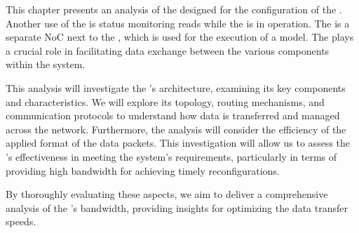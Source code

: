 This chapter presents an analysis of the \confignoc{} designed for the configuration of the \graicore{}.
Another use of the \confignoc{} is status monitoring reads while the \graicore{} is in operation.
The \confignoc{} is a separate NoC next to the \eventnoc{}, which is used for the execution of a model.
The \confignoc{} plays a crucial role in facilitating data exchange between the various components within the system.

This analysis will investigate the \confignoc{}'s architecture, examining its key components and characteristics.
We will explore its topology, routing mechanisms, and communication protocols to understand how data is transferred and managed across the network.
Furthermore, the analysis will consider the efficiency of the applied format of the data packets.  
This investigation will allow us to assess the \confignoc{}'s effectiveness in meeting the system's requirements, particularly in terms of providing high bandwidth for achieving timely reconfigurations.

By thoroughly evaluating these aspects, we aim to deliver a comprehensive analysis of the \confignoc{}'s bandwidth, providing insights for optimizing the data transfer speeds.

